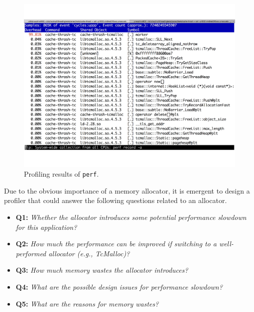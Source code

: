 \begin{figure}[!ht]
\centering
\includegraphics[width=0.9\columnwidth]{figures/perf-cache-thrash-tcmalloc}
\caption{Profiling results of \texttt{perf}. \label{fig:mot1}}
\end{figure}


Due to the obvious importance of a memory allocator, it is emergent to design a profiler that could answer the following questions related to an allocator. \\

\begin{itemize}
\item \textbf{Q1:} \textit{Whether the allocator introduces some potential performance slowdown for this application? }
\item \textbf{Q2:} \textit{How much the performance can be improved if switching to a well-performed allocator (e.g., TcMalloc)?}
\item \textbf{Q3:} \textit{How much memory wastes the allocator introduces?}
\item \textbf{Q4:} \textit{What are the possible design issues for performance slowdown?}
\item \textbf{Q5:} \textit{What are the reasons for memory wastes?} 
\end{itemize}
\vspace{0.1in}

